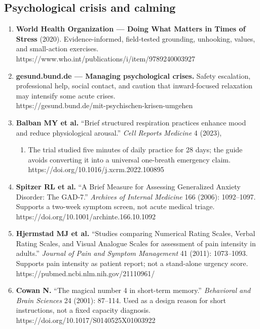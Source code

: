 \hypertarget{psychological-crisis-and-calming}{%
\subsection{Psychological crisis and
calming}\label{psychological-crisis-and-calming}}

\begin{enumerate}
\def\labelenumi{\arabic{enumi}.}
\setcounter{enumi}{7}
\item
  \textbf{World Health Organization --- Doing What Matters in Times of
  Stress} (2020). Evidence-informed, field-tested grounding, unhooking,
  values, and small-action exercises.\\
  https://www.who.int/publications/i/item/9789240003927
\item
  \textbf{gesund.bund.de --- Managing psychological crises.} Safety
  escalation, professional help, social contact, and caution that
  inward-focused relaxation may intensify some acute crises.\\
  https://gesund.bund.de/mit-psychischen-krisen-umgehen
\item
  \textbf{Balban MY et al.} ``Brief structured respiration practices
  enhance mood and reduce physiological arousal.'' \emph{Cell Reports
  Medicine} 4 (2023),

  \begin{enumerate}
  \def\labelenumii{\arabic{enumii}.}
  \setcounter{enumii}{100894}
  \tightlist
  \item
    The trial studied five minutes of daily practice for 28 days; the
    guide avoids converting it into a universal one-breath emergency
    claim.\\
    https://doi.org/10.1016/j.xcrm.2022.100895
  \end{enumerate}
\item
  \textbf{Spitzer RL et al.} ``A Brief Measure for Assessing Generalized
  Anxiety Disorder: The GAD-7.'' \emph{Archives of Internal Medicine}
  166 (2006): 1092--1097. Supports a two-week symptom screen, not acute
  medical triage.\\
  https://doi.org/10.1001/archinte.166.10.1092
\item
  \textbf{Hjermstad MJ et al.} ``Studies comparing Numerical Rating
  Scales, Verbal Rating Scales, and Visual Analogue Scales for
  assessment of pain intensity in adults.'' \emph{Journal of Pain and
  Symptom Management} 41 (2011): 1073--1093. Supports pain intensity as
  patient report; not a stand-alone urgency score.\\
  https://pubmed.ncbi.nlm.nih.gov/21110961/
\item
  \textbf{Cowan N.} ``The magical number 4 in short-term memory.''
  \emph{Behavioral and Brain Sciences} 24 (2001): 87--114. Used as a
  design reason for short instructions, not a fixed capacity
  diagnosis.\\
  https://doi.org/10.1017/S0140525X01003922
\end{enumerate}


